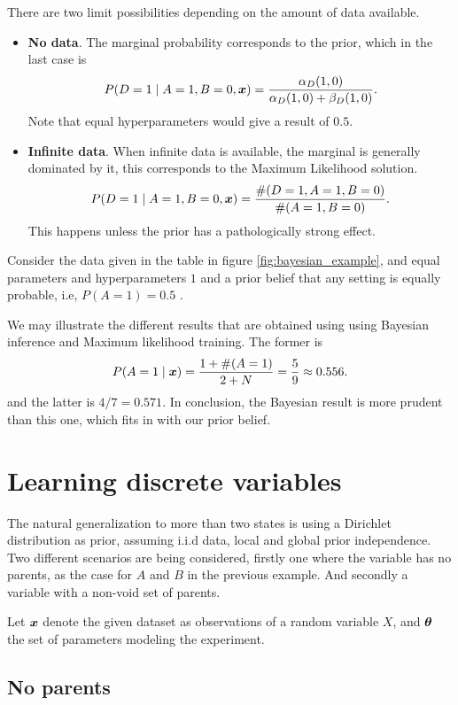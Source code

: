 There are two limit possibilities depending on the amount of data available.
\begin{itemize}
  \item \textbf{No data}. The marginal probability corresponds to the prior, which
in the last case is
    \[
    P(D = 1 \mid A = 1, B = 0, \bm{x}) = \frac{\alpha_{D}(1,0)}{\alpha_{D}(1,0) + \beta_{D}(1,0)}.
    \]
    Note that equal hyperparameters would give a result of \(0.5\).\newline
   
  \item \textbf{Infinite data}. When infinite data is available, the marginal is generally dominated by it,
    this corresponds to the Maximum Likelihood solution.
    \[
    P(D = 1 \mid A = 1, B = 0, \bm{x}) = \frac{\#(D = 1, A = 1 , B = 0)}{\#(A = 1, B = 0)}.
    \]
    This happens unless the prior has a pathologically strong effect.
\end{itemize}

 Consider the data given in the table in figure \ref{fig:bayesian_example}, and
 equal parameters and hyperparameters \(1\) and a prior belief that any setting is equally probable, i.e, \( P(A=1) = 0.5\) . 
 
 We may illustrate the different results that are obtained using using Bayesian inference and Maximum likelihood training. The former is
 \[
   P(A = 1 \mid \bm{x}) = \frac{1 + \#(A = 1)}{2 + N} = \frac{5}{9} \approx 0.556.
 \]
 and the latter is \(4/7 = 0.571\). In conclusion, the Bayesian
 result is more prudent than this one, which fits in with our prior belief.

 \section{Learning discrete variables}

 The natural generalization to more than two states is using a Dirichlet
 distribution as prior, assuming i.i.d data, local and global prior
 independence. Two different scenarios are being considered, firstly one where the
 variable has no parents, as the case for \(A\) and \(B\) in the previous
 example. And secondly a variable with a non-void set of parents.

 Let \(\bm{x}\) denote the given dataset as observations of a random variable \(X\), and \(\bm{\theta}\) the set of parameters modeling the experiment.

 \subsection{No parents}


